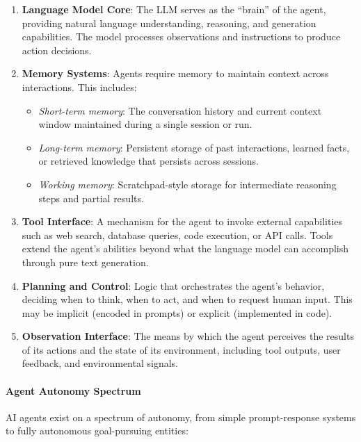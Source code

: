 \begin{enumerate}
    \item \textbf{Language Model Core}: The LLM serves as the ``brain'' of the agent, providing natural language understanding, reasoning, and generation capabilities. The model processes observations and instructions to produce action decisions.
    
    \item \textbf{Memory Systems}: Agents require memory to maintain context across interactions. This includes:
    \begin{itemize}
        \item \emph{Short-term memory}: The conversation history and current context window maintained during a single session or run.
        \item \emph{Long-term memory}: Persistent storage of past interactions, learned facts, or retrieved knowledge that persists across sessions.
        \item \emph{Working memory}: Scratchpad-style storage for intermediate reasoning steps and partial results.
    \end{itemize}
    
    \item \textbf{Tool Interface}: A mechanism for the agent to invoke external capabilities such as web search, database queries, code execution, or API calls. Tools extend the agent's abilities beyond what the language model can accomplish through pure text generation.
    
    \item \textbf{Planning and Control}: Logic that orchestrates the agent's behavior, deciding when to think, when to act, and when to request human input. This may be implicit (encoded in prompts) or explicit (implemented in code).
    
    \item \textbf{Observation Interface}: The means by which the agent perceives the results of its actions and the state of its environment, including tool outputs, user feedback, and environmental signals.
\end{enumerate}

\paragraph{Agent Autonomy Spectrum}
AI agents exist on a spectrum of autonomy, from simple prompt-response systems to fully autonomous goal-pursuing entities:

